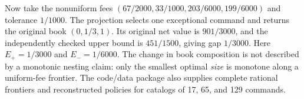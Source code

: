 Now take the nonuniform fees $(67/2000,33/1000,203/6000,199/6000)$ and tolerance $1/1000$. The projection selects one exceptional command and returns the original book $(0,1/3,1)$. Its original net value is $901/3000$, and the independently checked upper bound is $451/1500$, giving gap $1/3000$. Here $E_+=1/3000$ and $E_-=1/6000$. The change in book composition is not described by a monotonic nesting claim: only the smallest optimal \emph{size} is monotone along a uniform-fee frontier. The code/data package also supplies complete rational frontiers and reconstructed policies for catalogs of 17, 65, and 129 commands.
